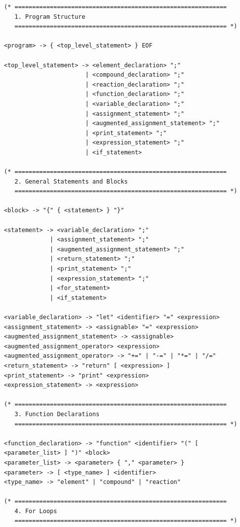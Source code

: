 \documentclass[11pt,a4paper]{article}
\begin{document}
\begin{lstlisting}[style=ebnf]
(* ============================================================
   1. Program Structure
   ============================================================ *)

<program> -> { <top_level_statement> } EOF

<top_level_statement> -> <element_declaration> ";"
                       | <compound_declaration> ";"
                       | <reaction_declaration> ";"
                       | <function_declaration> ";"
                       | <variable_declaration> ";"
                       | <assignment_statement> ";"
                       | <augmented_assignment_statement> ";"
                       | <print_statement> ";"
                       | <expression_statement> ";"
                       | <if_statement>

(* ============================================================
   2. General Statements and Blocks
   ============================================================ *)

<block> -> "{" { <statement> } "}"

<statement> -> <variable_declaration> ";"
             | <assignment_statement> ";"
             | <augmented_assignment_statement> ";"
             | <return_statement> ";"
             | <print_statement> ";"
             | <expression_statement> ";"
             | <for_statement>
             | <if_statement>

<variable_declaration> -> "let" <identifier> "=" <expression>
<assignment_statement> -> <assignable> "=" <expression>
<augmented_assignment_statement> -> <assignable> <augmented_assignment_operator> <expression>
<augmented_assignment_operator> -> "+=" | "-=" | "*=" | "/="
<return_statement> -> "return" [ <expression> ]
<print_statement> -> "print" <expression>
<expression_statement> -> <expression>

(* ============================================================
   3. Function Declarations
   ============================================================ *)

<function_declaration> -> "function" <identifier> "(" [ <parameter_list> ] ")" <block>
<parameter_list> -> <parameter> { "," <parameter> }
<parameter> -> [ <type_name> ] <identifier>
<type_name> -> "element" | "compound" | "reaction"

(* ============================================================
   4. For Loops
   ============================================================ *)


\end{lstlisting}
\end{document}

